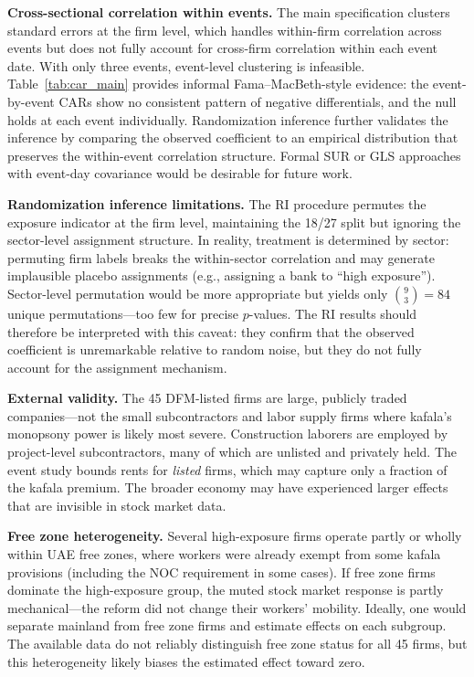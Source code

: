\documentclass[12pt]{article}
\begin{document}
\textbf{Cross-sectional correlation within events.} The main specification clusters standard errors at the firm level, which handles within-firm correlation across events but does not fully account for cross-firm correlation within each event date. With only three events, event-level clustering is infeasible. Table~\ref{tab:car_main} provides informal Fama--MacBeth-style evidence: the event-by-event CARs show no consistent pattern of negative differentials, and the null holds at each event individually. Randomization inference further validates the inference by comparing the observed coefficient to an empirical distribution that preserves the within-event correlation structure. Formal SUR or GLS approaches with event-day covariance \citep{cameron2008bootstrap} would be desirable for future work.

\textbf{Randomization inference limitations.} The RI procedure permutes the exposure indicator at the firm level, maintaining the 18/27 split but ignoring the sector-level assignment structure. In reality, treatment is determined by sector: permuting firm labels breaks the within-sector correlation and may generate implausible placebo assignments (e.g., assigning a bank to ``high exposure''). Sector-level permutation would be more appropriate but yields only $\binom{9}{3} = 84$ unique permutations---too few for precise $p$-values. The RI results should therefore be interpreted with this caveat: they confirm that the observed coefficient is unremarkable relative to random noise, but they do not fully account for the assignment mechanism.

\textbf{External validity.} The 45 DFM-listed firms are large, publicly traded companies---not the small subcontractors and labor supply firms where kafala's monopsony power is likely most severe. Construction laborers are employed by project-level subcontractors, many of which are unlisted and privately held. The event study bounds rents for \emph{listed} firms, which may capture only a fraction of the kafala premium. The broader economy may have experienced larger effects that are invisible in stock market data.

\textbf{Free zone heterogeneity.} Several high-exposure firms operate partly or wholly within UAE free zones, where workers were already exempt from some kafala provisions (including the NOC requirement in some cases). If free zone firms dominate the high-exposure group, the muted stock market response is partly mechanical---the reform did not change their workers' mobility. Ideally, one would separate mainland from free zone firms and estimate effects on each subgroup. The available data do not reliably distinguish free zone status for all 45 firms, but this heterogeneity likely biases the estimated effect toward zero.
\end{document}
